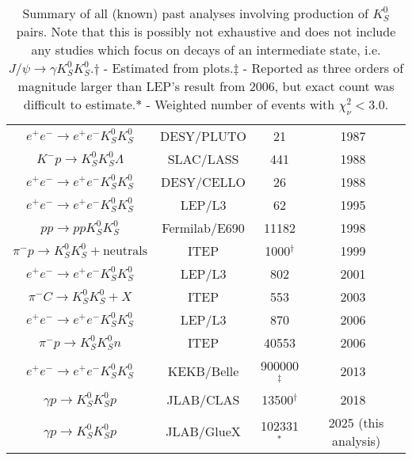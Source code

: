 \begin{table}
\begin{center}
\begin{tabular}{cccc}
      $e^+e^- \to e^+e^- K_S^0 K_S^0$ & DESY/PLUTO & 21 & 1987~\cite{berger_tensor_1988}\\
      $K^- p \to K_S^0 K_S^0 \Lambda$ & SLAC/LASS & 441 & 1988~\cite{aston_study_1988}\\
      $e^+e^- \to e^+e^- K_S^0 K_S^0$ & DESY/CELLO & 26 & 1988~\cite{behrend_theks0ks0final_1989}\\
      $e^+e^- \to e^+e^- K_S^0 K_S^0$ & LEP/L3 & 62 & 1995~\cite{acciarri_study_1995}\\
      $pp \to pp K_S^0 K_S^0$ & Fermilab/E690 & 11182 & 1998~\cite{reyes_partial_1998}\\
      $\pi^- p \to K_S^0 K_S^0 + \text{neutrals}$ & ITEP & 1000${}^\dagger$ & 1999~\cite{barkov_discovery_1999}\\
      $e^+e^- \to e^+e^- K_S^0 K_S^0$ & LEP/L3 & 802 & 2001~\cite{acciarri_k0sk0s_2001}\\
      $\pi^- C \to K_S^0 K_S^0 + X$ & ITEP & 553 & 2003~\cite{tikhomirov_resonances_2003}\\
      $e^+e^- \to e^+e^- K_S^0 K_S^0$ & LEP/L3 & 870 & 2006~\cite{schegelsky_k0_2006}\\
      $\pi^- p \to K_S^0 K_S^0 n$ & ITEP & 40553 & 2006~\cite{vladimirsky_analysis_2006}\\
      $e^+e^- \to e^+e^- K_S^0 K_S^0$ & KEKB/Belle & 900000${}^\ddagger$ & 2013~\cite{uehara_high-statistics_2013}\\
      $\gamma p \to K_S^0 K_S^0 p$ & JLAB/CLAS & 13500${}^\dagger$ & 2018~\cite{the_clas_collaboration_double_2018}\\
      $\gamma p \to K_S^0 K_S^0 p$ & JLAB/GlueX & 102331${}^\ast$ & 2025 (this analysis)\\\bottomrule
    \end{tabular}
    \caption{Summary of all (known) past analyses involving production of $K_S^0$ pairs. Note that this is possibly not exhaustive and does not include any studies which focus on decays of an intermediate state, i.e. $J/\psi \to \gamma K_S^0K_S^0$.\newline$\dagger$ - Estimated from plots.\newline$\ddagger$ - Reported as three orders of magnitude larger than LEP's result from 2006, but exact count was difficult to estimate.\newline$\ast$ - Weighted number of events with $\chi^2_\nu < 3.0$.}\label{tab:past-analyses}
  \end{center}
\end{table}
